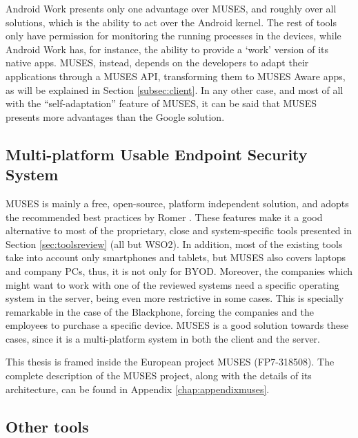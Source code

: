 Android Work presents only one advantage over MUSES, and roughly over all solutions, which is the ability to act over the Android kernel. The rest of tools only have permission for monitoring the running processes in the devices, while Android Work has, for instance, the ability to provide a `work' version of its native apps. MUSES, instead, depends on the developers to adapt their applications through a MUSES API, transforming them to MUSES Aware apps, as will be explained in Section \ref{subsec:client}. In any other case, and most of all with the ``self-adaptation'' feature of MUSES, it can be said that MUSES presents more advantages than the Google solution.


\subsection{Multi-platform Usable Endpoint Security System}
\label{subsec:musestool}

MUSES is mainly a free, open-source, platform independent solution, and adopts the recommended best practices by Romer \cite{Romer14BestPractices}. These features make it a good alternative to most of the proprietary, close and system-specific tools presented in Section \ref{sec:toolsreview} (all but WSO2). In addition, most of the existing tools take into account only smartphones and tablets, but MUSES also covers laptops and company PCs, thus, it is not only for BYOD. Moreover, the companies which might want to work with one of the reviewed systems need a specific operating system in the server, being even more restrictive in some cases. This is specially remarkable in the case of the Blackphone, forcing the companies and the employees to purchase a specific device. MUSES is a good solution towards these cases, since it is a multi-platform system in both the client and the server.

This thesis is framed inside the European project MUSES (FP7-318508). The complete description of the MUSES project, along with the details of its architecture, can be found in Appendix \ref{chap:appendixmuses}.


\subsection{Other tools}
\label{subsec:othertools}

